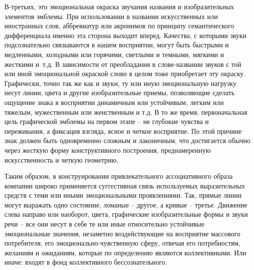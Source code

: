 В-третьих, это эмоциональная окраска звучания названия и изобразительных
элементов эмблемы. При использовании в названии искусственных или иностранных
слов, аббревиатур или акронимов по принципу семантического дифференциала именно
эта сторона выходит вперед. Качества, с которыми звуки подсознательно связываются
в нашем восприятии, могут быть быстрыми и медленными, холодными или горячими,
светлыми и темными, мягкими и жесткими
и~т.д\autocite{juravlev1991zvuk}. В зависимости от преобладания в слове-названии
звуков с той или иной эмоциональной окраской слово в целом тоже приобретает эту
окраску. Графически, точно так же как и звуки, ту или иную эмоциональную
нагрузку несут линии, цвета и другие изобразительные приемы, позволяющие
сделать ощущение знака в восприятии динамичным или устойчивым, легким или
тяжелым, мужественным или женственным и т.д. В то же время, первоначальная цель
графической эмблемы на первом этапе -- не глубокие чувства и переживания, а
фиксация взгляда, ясное и четкое восприятие. По этой причине знак должен быть
одновременно сложным и лаконичным, что достигается обычно через жесткую форму
конструктивного построения, преднамеренную искусственность и четкую геометрию.

Таким образом, в конструировании привлекательного ассоциативного образа компании
широко применяется суггестивная связь используемых выразительных средств с теми
или иными эмоциональными проявлениями. Так, прямые линии  могут выражать одно
состояние, ломаные -- другое, а кривые -- третье. Движение слева направо или
наоборот,  цвета, графические изобразительные формы и звуки речи -- все они
несут в себе те или иные относительно устойчивые эмоциональные значения,
незаметно воздействующие на восприятие массового потребителя, его
эмоционально-чувственную сферу, отвечая его потребностям, желаниям и ожиданиям,
которые по определению являются коллективными. Или иначе: входят в фонд
коллективного бессознательного.

